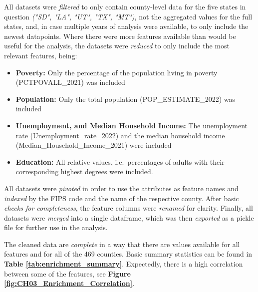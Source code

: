 All datasets were \textit{filtered} to only contain county-level data for the five states in question \textit{("SD", "LA", "UT", "TX", "MT")}, not the aggregated values for the full states, and, in case multiple years of analysis were available, to only include the newest datapoints. 
Where there were more features available than would be useful for the analysis, the datasets were \textit{reduced} to only include the most relevant features, being:

\begin{itemize}
    \item \textbf{Poverty:} Only the percentage of the population living in poverty (PCTPOVALL\_2021) was included
    \item \textbf{Population:} Only the total population (POP\_ESTIMATE\_2022) was included
    \item \textbf{Unemployment, and Median Household Income:} The unemployment rate (Unemployment\_rate\_2022) and the median household income (Median\_Household\_Income\_2021) were included
    \item \textbf{Education:} All relative values, i.e.\ percentages of adults with their corresponding highest degrees were included.
\end{itemize}

All datasets were \textit{pivoted} in order to use the attributes as feature names and \textit{indexed} by the FIPS code and the name of the respective county. 
After basic \textit{checks for completeness}, the feature columns were \textit{renamed} for clarity. Finally, all datasets were \textit{merged} into a single dataframe, which was then \textit{exported} as a pickle file for further use in the analysis.

The cleaned data are \textit{complete} in a way that there are values available for all features and for all of the 469 counties. Basic summary statistics can be found in \textbf{Table \ref{tab:enrichment_summary}}. 
Expectedly, there is a high correlation between some of the features, see \textbf{Figure \ref{fig:CH03_Enrichment_Correlation}}.

